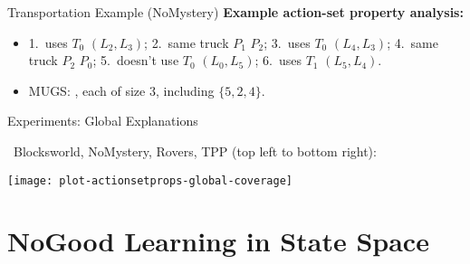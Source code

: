 \begin{frame}{Transportation Example (NoMystery)}
\textbf{Example action-set property analysis:} 

\begin{itemize}
\item 1.\ uses $T_0$ $(L_2,L_3)$; 2.\ same truck 
$P_1$ $P_2$; 3.\ uses $T_0$ $(L_4,L_3)$; 4.\ same truck $P_2$ $P_0$;
5.\ doesn't use $T_0$ $(L_0,L_5)$; 6.\ uses $T_1$ $(L_5,L_4)$.
\item MUGS: , each of size 3, including $\{5, 2, 4\}$.
\end{itemize}

 \pause
{}

\medskip

\end{frame}


\begin{frame}{Experiments: Global Explanations}

\notesym~Blocksworld, NoMystery, Rovers, TPP (top left to bottom right):

\centering

\medskip

\texttt{[image: plot-actionsetprops-global-coverage]}

\smallskip

\end{frame}



%

\section[NoGoods]{NoGood Learning in State Space}
\subsection*{}

\begin{frame}{}

\end{frame}



